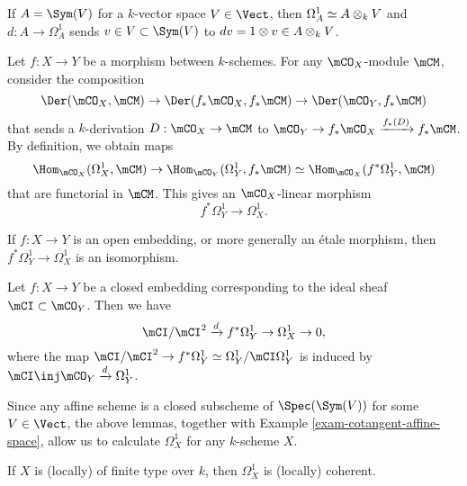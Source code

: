 	\begin{exam}
		\label{exam-cotangent-affine-space}
		If $A=\Sym(V)$ for a $k$-vector space $V\in \Vect$, then $\Omega_{A}^1 \simeq A\ot_k V$ and $d: A\to \Omega_{A}^1$ sends $v\in V \subset \Sym(V)$ to $dv=1\ot v \in A\ot_k V $.
	\end{exam}
	
	\begin{constr}
		Let $f:X\to Y$ be a morphism between $k$-schemes. For any $\mCO_X$-module $\mCM$, consider the composition
		\[
			\Der(\mCO_X,\mCM) \to \Der( f_* \mCO_X, f_* \mCM ) \to \Der( \mCO_Y, f_* \mCM )
		\]
		that sends a $k$-derivation $D: \mCO_X \to \mCM$ to $\mCO_Y \to f_* \mCO_X \xrightarrow{f_*(D)} f_* \mCM$. By definition, we obtain maps
		\[
			\Hom_{\mCO_X}(\Omega_{X}^1, \mCM) \to \Hom_{\mCO_Y}(\Omega_{Y}^1, f_*\mCM) \simeq  \Hom_{\mCO_X}(f^*\Omega_{Y}^1, \mCM)
		\] 
		that are functorial in $\mCM$. This gives an $\mCO_X$-linear morphism
		\begin{equation}
			\label{eqn-functorial-cotangent}
			f^*\Omega_{Y}^1\to \Omega_{X}^1.
		\end{equation}
	\end{constr}

	\begin{lem}
		If $f: X\to Y$ is an open embedding, or more generally an étale morphism, then $f^*\Omega_{Y}^1\to \Omega_{X}^1$ is an isomorphism.
	\end{lem}

	\begin{lem}
		Let $f:X\to Y$ be a closed embedding corresponding to the ideal sheaf $\mCI \subset \mCO_Y$. Then we have 
		\[
			\mCI/\mCI^2 \xrightarrow{d} f^*\Omega_{Y}^1\to \Omega_{X}^1 \to 0,
		\]
		where the map $\mCI/\mCI^2 \to f^*\Omega_Y^1 \simeq \Omega_Y^1/\mCI\Omega_Y^1$ is induced by $\mCI\inj \mCO_Y \xrightarrow{d}\Omega_Y^1$.
	\end{lem}

	\begin{rem}
		Since any affine scheme is a closed subscheme of $\Spec(\Sym(V))$ for some $V\in \Vect$, the above lemmas, together with Example \ref{exam-cotangent-affine-space}, allow us to calculate $\Omega_{X}^1$ for any $k$-scheme $X$.
	\end{rem}

	\begin{cor}
		If $X$ is (locally) of finite type over $k$, then $\Omega^1_{X}$ is (locally) coherent.
	\end{cor}

